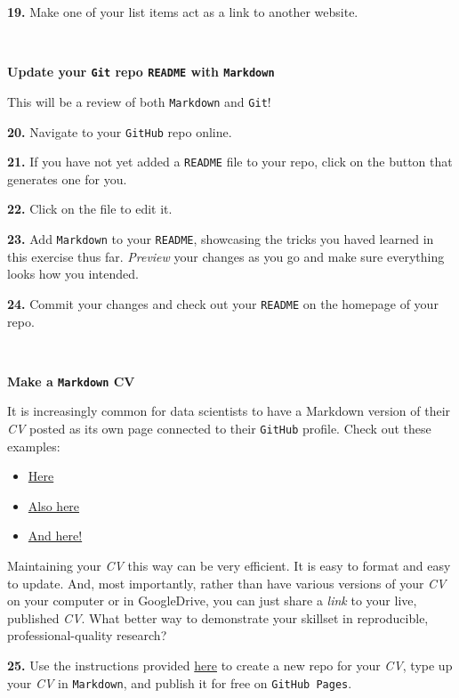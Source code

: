 \documentclass[]{book}
\providecommand{\tightlist}{%
  \setlength{\itemsep}{0pt}\setlength{\parskip}{0pt}}
\begin{document}
\textbf{19.} Make one of your list items act as a link to another website.

~

\textbf{Update your \texttt{Git} repo \texttt{README} with \texttt{Markdown}}

This will be a review of both \texttt{Markdown} and \texttt{Git}!

\textbf{20.} Navigate to your \texttt{GitHub} repo online.

\textbf{21.} If you have not yet added a \texttt{README} file to your repo, click on the button that generates one for you.

\textbf{22.} Click on the file to edit it.

\textbf{23.} Add \texttt{Markdown} to your \texttt{README}, showcasing the tricks you haved learned in this exercise thus far. \emph{Preview} your changes as you go and make sure everything looks how you intended.

\textbf{24.} Commit your changes and check out your \texttt{README} on the homepage of your repo.

~

\textbf{Make a \texttt{Markdown} CV}

It is increasingly common for data scientists to have a Markdown version of their \emph{CV} posted as its own page connected to their \texttt{GitHub} profile. Check out these examples:

\begin{itemize}
\tightlist
\item
  \href{https://carolstran.github.io/cv/}{Here}\\
\item
  \href{https://github.com/ViliamV/easy-markdown-cv}{Also here}\\
\item
  \href{http://wodenimoni.com/nimo-markdown-cv/}{And here!}
\end{itemize}

Maintaining your \emph{CV} this way can be very efficient. It is easy to format and easy to update. And, most importantly, rather than have various versions of your \emph{CV} on your computer or in GoogleDrive, you can just share a \emph{link} to your live, published \emph{CV}. What better way to demonstrate your skillset in reproducible, professional-quality research?

\textbf{25.} Use the instructions provided \href{https://workwithcarolyn.com/blog/digital-cv-guide}{here} to create a new repo for your \emph{CV}, type up your \emph{CV} in \texttt{Markdown}, and publish it for free on \texttt{GitHub\ Pages}.
\end{document}
